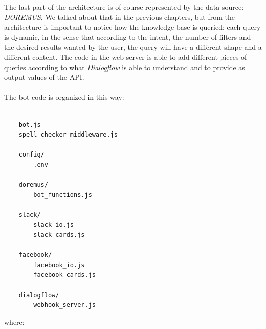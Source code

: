 \documentclass[a4paper,12pt]{report}
\begin{document}
	The last part of the architecture is of course represented by the data source: \textit{DOREMUS}. We talked about that in the previous chapters, but from the architecture is important to notice how the knowledge base is queried: each query is dynamic, in the sense that according to the intent, the number of filters and the desired results wanted by the user, the query will have a different shape and a different content. The code in the web server is able to add different pieces of queries according to what \textit{Dialogflow} is able to understand and to provide as output values of the API.\\\\
	The bot code is organized in this way:
	\begin{lstlisting}
	
	bot.js
	spell-checker-middleware.js
	
	config/
		.env
	
	doremus/
		bot_functions.js
	
	slack/
		slack_io.js
		slack_cards.js
	
	facebook/
		facebook_io.js
		facebook_cards.js
		
	dialogflow/
		webhook_server.js
	\end{lstlisting}
	where:
\end{document}
